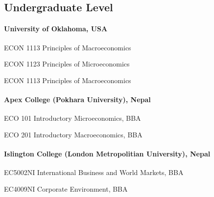 
\subsection{Undergraduate Level}

\paragraph{University of Oklahoma, USA}

{%
	}
{%
	ECON 1113 Principles of Macroeconomics}
{}

{%
	}
{%
	ECON 1123 Principles of Microeconomics}
{}

{%
	}
{%
	ECON 1113 Principles of Macroeconomics}
{}

\paragraph{Apex College (Pokhara University), Nepal}

{%
	}
{%
	ECO 101 Introductory Microeconomics, BBA}
{}

{%
	}
{%
	ECO 201 Introductory Macroeconomics, BBA}
{}

\paragraph{Islington College (London Metropolitian University), Nepal}

{%
	}
{%
	EC5002NI International Business and World Markets, BBA}
{}

{%
	}
{%
	EC4009NI Corporate Environment, BBA}
{}



